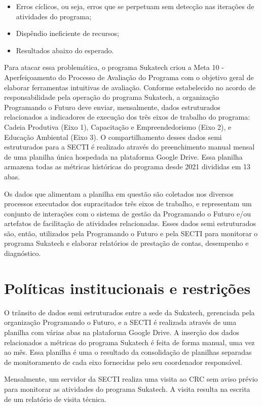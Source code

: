 \documentclass[
	12pt,				%
	openright,			%
	twoside,			%
	a4paper,			%
	english,			%
	french,				%
	spanish,			%
	brazil,				%
	]{abntex2}
\begin{document}
\begin{itemize}
  \item Erros cíclicos, ou seja, erros que se perpetuam sem detecção nas iterações de atividades do programa;
  \item Dispêndio ineficiente de recursos;
  \item Resultados abaixo do esperado.
\end{itemize}


Para atacar essa problemática, o programa Sukatech criou a Meta 10 - Aperfeiçoamento do Processo de Avaliação do Programa com o objetivo geral de elaborar ferramentas intuitivas de avaliação. Conforme estabelecido no acordo de responsabilidade pela operação do programa Sukatech, a organização Programando o Futuro deve enviar, mensalmente, dados estruturados relacionados a indicadores de execução dos três eixos de trabalho do programa: Cadeia Produtiva (Eixo 1), Capacitação e Empreendedorismo (Eixo 2), e Educação Ambiental (Eixo 3). O compartilhamento desses dados semi estruturados para a SECTI é realizado através do preenchimento manual mensal de uma planilha única hospedada na plataforma Google Drive. Essa planilha armazena todas as métricas históricas do programa desde 2021 divididas em 13 abas.

Os dados que alimentam a planilha em questão são coletados nos diversos processos executados dos supracitados três eixos de trabalho, e representam um conjunto de interações com o sistema de gestão da Programando o Futuro e/ou artefatos de facilitação de atividades relacionadas. Esses dados semi estruturados são, então, utilizados pela Programando o Futuro e pela SECTI para monitorar o programa Sukatech e elaborar relatórios de prestação de contas, desempenho e diagnóstico.

\section{Políticas institucionais e restrições}

O trânsito de dados semi estruturados entre a sede da Sukatech, gerenciada pela organização Programando o Futuro, e a SECTI é realizada através de uma planilha com várias abas na plataforma Google Drive. A inserção dos dados relacionados a métricas do programa Sukatech é feita de forma manual, uma vez ao mês. Essa planilha é uma o resultado da consolidação de planilhas separadas de monitoramento de cada eixo fornecidas pelo seu coordenador responsável.

Mensalmente, um servidor da SECTI realiza uma visita ao CRC sem aviso prévio para monitorar as atividades do programa Sukatech. A visita resulta na escrita de um relatório de visita técnica.
\end{document}
